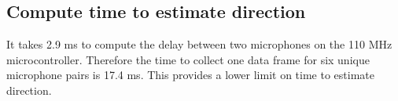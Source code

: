 

\subsection{Compute time to estimate direction} 
It takes 2.9 ms to compute the delay between two microphones on the 110 MHz microcontroller. Therefore the time to collect one data frame for six unique microphone pairs is 17.4 ms. This provides a lower limit on time to estimate direction. 

